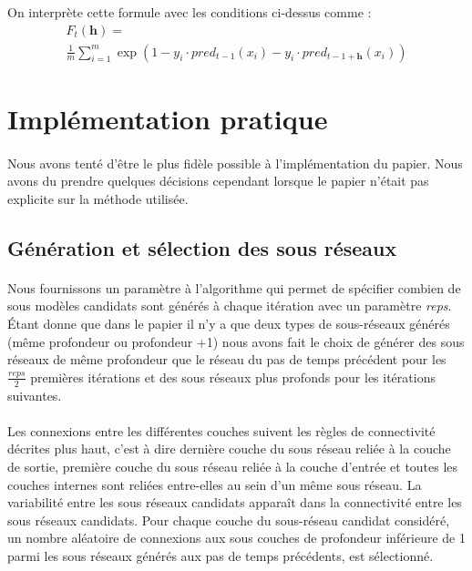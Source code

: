 \documentclass[11 pt]{article}
\begin{document}
\bigskip

On interprète cette formule avec les conditions ci-dessus comme :
\begin{multline*}
F_t(\mathbf{h})=\\
\frac{1}{m}\sum^m_{i=1}\exp(1-y_i \cdot pred_{t-1}(x_i)-y_i \cdot pred_{t-1 + \mathbf{h}}(x_i))
\end{multline*}

\section{Implémentation pratique}
\paragraph{}Nous avons tenté d’être le plus fidèle possible à l’implémentation du papier. Nous avons du prendre quelques décisions cependant lorsque le papier n’était pas explicite sur la méthode utilisée.
\subsection{Génération et sélection des sous réseaux}
\paragraph{}Nous fournissons un paramètre à l'algorithme qui permet de spécifier combien de sous modèles candidats sont générés \`a chaque itération avec un paramètre \emph{reps}. Étant donne que dans le papier il n'y a que deux types de sous-réseaux générés (même profondeur ou profondeur +1) nous avons fait le choix de générer des sous réseaux de même profondeur que le réseau du pas de temps précédent pour les $\frac{reps}{2}$ premières itérations et des sous réseaux plus profonds pour les itérations suivantes.
\paragraph{}Les connexions entre les différentes couches suivent les règles de connectivité décrites plus haut, c'est \`a dire dernière couche du sous réseau reliée à la couche de sortie, première couche du sous réseau reliée à la couche d’entrée et toutes les couches internes sont reliées entre-elles au sein d'un même sous réseau. La variabilité entre les sous réseaux candidats apparaît dans la connectivité entre les sous réseaux candidats. Pour chaque couche du sous-réseau candidat considéré, un nombre aléatoire de connexions aux sous couches de profondeur inférieure de 1 parmi les sous réseaux générés aux pas de temps précédents, est sélectionné.
\end{document}

